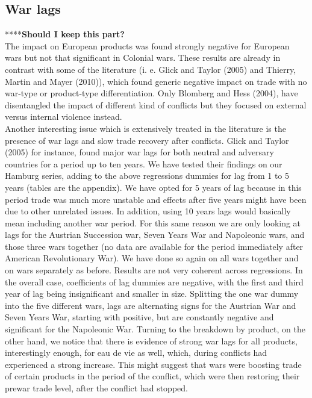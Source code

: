 \documentclass[12pt,a4paper,titlepage,english]{article}
\begin{document}
\subsection{War lags}
****\textbf{Should I keep this part?}\\
The impact on European products was found strongly negative for European wars but not that significant in Colonial wars. These results are already in contrast with some of the literature (i. e. Glick and Taylor (2005) and Thierry, Martin and Mayer (2010)), which found generic negative impact on trade with no war-type or product-type differentiation. Only Blomberg and Hess (2004), have disentangled the impact of different kind of conflicts but they focused on external versus internal violence instead.\\
Another interesting issue which is extensively treated in the literature is the presence of war lags and slow trade recovery after conflicts. Glick and Taylor (2005) for instance, found major war lags for both neutral and adversary countries for a period up to ten years. We have tested their findings on our Hamburg series, adding to the above regressions dummies for lag from 1 to 5 years (tables are the appendix). We have opted for 5 years of lag because in this period trade was much more unstable and effects after five years might have been due to other unrelated issues. In addition, using 10 years lags would basically mean including another war period. For this same reason we are only looking at lags for the Austrian Succession war, Seven Years War and Napoleonic wars, and those three wars together (no data are available for the period immediately after American Revolutionary War). We have done so again on all wars together and on wars separately as before. Results are not very coherent across regressions. In the overall case, coefficients of lag dummies are negative, with the first and third year of lag being insignificant and smaller in size. Splitting the one war dummy into the five different wars, lags are alternating signs for the Austrian War and Seven Years War, starting with positive, but are constantly negative and significant for the Napoleonic War.
Turning to the breakdown by product, on the other hand, we notice that there is evidence of strong war lags for all products, interestingly enough, for eau de vie as well, which, during conflicts had experienced a strong increase. This might suggest that wars were boosting trade of certain products in the period of the conflict, which were then restoring their prewar trade level, after the conflict had stopped.\\
\end{document}
